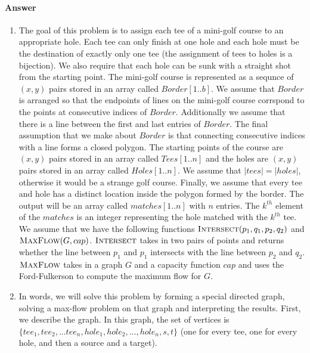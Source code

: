 \documentclass{article}
\begin{document}
\paragraph{Answer}


\begin{enumerate}
    \item The goal of this problem is to assign each tee of a mini-golf course to an appropriate hole.
    Each tee can only finish at one hole and each hole must be the destination of exactly only one tee (the assignment of tees to holes is a bijection).
    We also require that each hole can be sunk with a straight shot from the starting point. \parspace
    The mini-golf course is represented as a sequnce of $(x,y)$ pairs stored in an array called $Border[1..b]$.
    We assume that $Border$ is arranged so that the endpoints of lines on the mini-golf course corrspond to the points at consecutive indices of $Border$.
    Additionally we assume that there is a line between the first and last entries of $Border$.
    The final assumption that we make about $Border$ is that connecting consecutive indices with a line forms a closed polygon. \parspace
    The starting points of the course are $(x,y)$ pairs stored in an array called $Tees[1..n]$ and the holes are $(x,y)$ pairs stored in an array called $Holes[1..n]$.
    We assume that $|tees| = |holes|$, otherwise it would be a strange golf course.
    Finally, we assume that every tee and hole has a distinct location inside the polygon formed by the border. \parspace
    The output will be an array called $matches[1..n]$ with $n$ entries.
    The $k^{th}$ element of the $matches$ is an integer representing the hole matched with the $k^{th}$ tee. \parspace
    We assume that we have the following functions $\textsc{Intersect}(p_1, q_1, p_2, q_2)$ and $\textsc{MaxFlow}(G, cap)$.
    $\textsc{Intersect}$ takes in two pairs of points and returns whether the line between $p_1$ and $p_1$ intersects with the line between $p_2$ and $q_2$.
    $\textsc{MaxFlow}$ takes in a graph $G$ and a capacity function $cap$ and uses the Ford-Fulkerson to compute the maximum flow for $G$.
    \item In words, we will solve this problem by forming a special directed graph, solving a max-flow problem on that graph and interpreting the results.
    First, we describe the graph.
    In this graph, the set of vertices is $\{ tee_1, tee_2, ... tee_n, hole_1, hole_2, ..., hole_n, s, t \}$ (one for every tee, one for every hole, and then a source and a target).

\end{enumerate}
\end{document}
